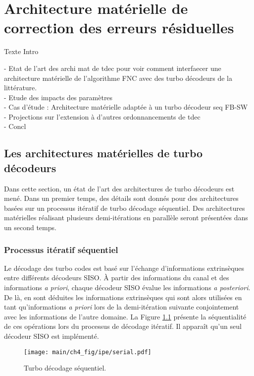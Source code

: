 \chapter{Architecture matérielle de correction des erreurs résiduelles}

Texte Intro

- Etat de l'art des archi mat de tdec pour voir comment interfaecer une architecture matérielle de l'algorithme FNC avec
des turbo décodeurs de la littérature.\\
- Etude des impacts des paramètres\\
- Cas d'étude : Architecture matérielle adaptée à un turbo décodeur seq FB-SW\\
- Projections sur l'extension à d'autres ordonnancements de tdec\\
- Concl
\vspace*{\fill}
\minitocTITI
\vspace*{\fill}
\newpage

\section{Les architectures matérielles de turbo décodeurs}
Dans cette section, un état de l'art des architectures de turbo décodeurs est mené. Dans un premier temps, des détails 
sont donnés pour des architectures basées sur un processus itératif de turbo décodage séquentiel. Des architectures 
matérielles réalisant plusieurs demi-itérations en parallèle seront présentées dans un second temps.

\subsection{Processus itératif séquentiel}
Le décodage des turbo codes est basé sur l'échange d'informations extrinsèques entre différents décodeurs SISO. À partir 
des informations du canal et des informations \textit{a priori}, chaque décodeur SISO évalue les informations 
\textit{a posteriori}. De là, en sont déduites les informations extrinsèques qui sont alors utilisées en tant
qu'informations \textit{a priori} lors de la demi-itération suivante conjointement avec les informations de l'autre
domaine. La Figure \ref{fig:turbo_seq} présente la séquentialité de ces opérations lors du processus de décodage
itératif. Il apparaît qu'un seul décodeur SISO est implémenté. 

\begin{figure}[!h]
	\centering
	\texttt{[image: main/ch4\_fig/ipe/serial.pdf]}
	\caption{Turbo décodage séquentiel. \label{fig:turbo_seq}}
\end{figure} 

